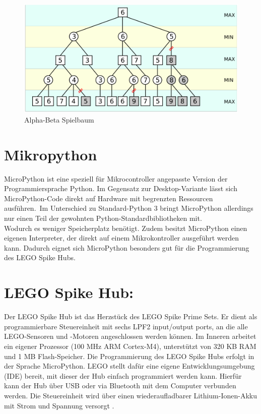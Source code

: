 \begin{figure}[H]
	\centering
	\includegraphics[width=1\linewidth]{images/alpha_beta}
	\caption[Alpha-Beta Spielbaum Quelle: \autocite{wikimediaABpruning}]{Alpha-Beta Spielbaum}
	\label{fig:alphabeta}
\end{figure}



\section{Mikropython}
MicroPython ist eine speziell für Mikrocontroller angepasste Version der Programmiersprache Python. Im Gegensatz zur Desktop-Variante lässt sich MicroPython-Code direkt auf Hardware mit begrenzten Ressourcen ausführen\autocite{energy_responsiveness2023}\autocite{Plauska2023}.\
Im Unterschied zu Standard-Python 3 bringt MicroPython allerdings nur einen Teil der gewohnten Python-Standardbibliotheken mit.\\ Wodurch es weniger Speicherplatz benötigt.
Zudem besitzt MicroPython einen eigenen Interpreter, der direkt auf einem Mikrokontroller ausgeführt werden kann.
Dadurch eignet sich MicroPython besonders gut für die Programmierung des LEGO Spike Hubs\autocite{bell2024micropython}.



\section{LEGO Spike Hub:}
Der LEGO Spike Hub ist das Herzstück des LEGO Spike Prime Sets. Er dient als programmierbare Steuereinheit mit sechs LPF2 input/output ports, an die alle LEGO-Sensoren und -Motoren angeschlossen werden können. Im Inneren arbeitet ein eigener Prozessor (100 MHz ARM Cortex-M4), unterstützt von 320 KB RAM und 1 MB Flash-Speicher. Die Programmierung des LEGO Spike Hubs erfolgt in der Sprache MicroPython. LEGO stellt dafür eine eigene Entwicklungsumgebung (IDE) bereit, mit dieser der Hub einfach programmiert werden kann. Hierfür kann der Hub über USB oder via Bluetooth mit dem Computer verbunden werden. Die Steuereinheit wird über einen  wiederaufladbarer Lithium-Ionen-Akku mit Strom und Spannung versorgt \autocite{lego2020techniclargehub}.

